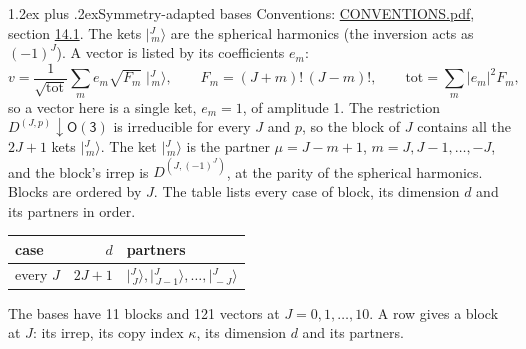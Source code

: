 \documentclass[10pt,a4paper]{article}
\makeatletter
\renewcommand\section{\@startsection{section}{1}{\z@}{-3ex plus -1ex minus -.2ex}%
  {1.2ex plus .2ex}{\normalfont\large\sffamily\bfseries\color{parttitle}}}
\numberwithin{equation}{section}
\newcommand{\grp}[1]{\mathsf{#1}}
\newcommand{\restr}[2]{#1\!\downarrow#2}
\newcommand{\irrJp}[2]{D^{(#1,#2)}}
\newcommand{\mult}{\kappa}
\newcommand{\intx}{\mu}
\newcommand{\jm}[2]{\bigl\lvert{}^{#1}_{\,#2}\bigr\rangle}
\makeatother
\begin{document}
\section{Symmetry-adapted bases}\label{s:bases}
Conventions: \href{../../CONVENTIONS.pdf}{CONVENTIONS.pdf}, section \href{../../CONVENTIONS.pdf\#conv.14.1}{14.1}.
\leavevmode\label{n:index.m}\label{n:vector.ket}The kets $\jm{J}{m}$ are the spherical harmonics (the inversion acts as $(-1)^J$). \label{n:index.ketcoefficient}\label{n:vector.basis.symmetry}\label{n:index.ketweight}\label{n:index.total}A vector is listed by its coefficients $e_m$:
\begin{equation}\label{e:ket}v = \frac{1}{\sqrt{\mathrm{tot}}}\sum_m e_m\sqrt{F_m}\;\jm{J}{m},\qquad F_m = (J+m)!\,(J-m)!,\qquad \mathrm{tot} = \sum_m |e_m|^2F_m,\end{equation}
so a vector here is a single ket, $e_m = 1$, of amplitude 1.
The restriction $\restr{\irrJp{J}{p}}{\grp{O(3)}}$ is irreducible for every $J$ and $p$, so the block of $J$ contains all the $2J+1$ kets $\jm{J}{m}$. The ket $\jm{J}{m}$ is the partner $\intx = J - m + 1$, $m = J, J-1, \dots, -J$, and the block's irrep is $\irrJp{J}{(-1)^J}$, at the parity of the spherical harmonics. Blocks are ordered by $J$. \label{n:head.case}\label{n:head.partners}The table lists every case of block, its dimension $d$ and its partners in order.
\begin{center}\begin{tabular}{@{}lrl@{}}\toprule
case & $d$ & partners\\\midrule
every $J$ & $2J+1$ & $\jm{J}{J}, \jm{J}{J-1}, \dots, \jm{J}{-J}$\\
\bottomrule\end{tabular}\end{center}
The bases have 11 blocks and 121 vectors at $J = 0, 1, \dots, 10$. \label{n:index.copy}\label{n:head.irrep}A row gives a block at $J$: its irrep, its copy index $\mult$, its dimension $d$ and its partners.
\end{document}
